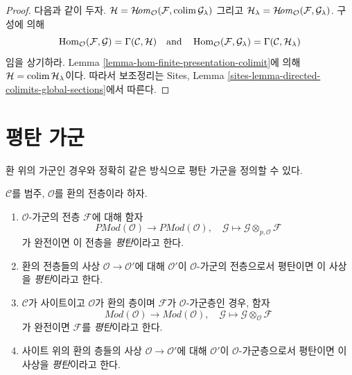 \begin{proof}
다음과 같이 두자.
$\mathcal{H} =
\mathop{\mathcal{H}\!\mathit{om}}\nolimits_\mathcal{O}(\mathcal{F}, \mathop{\mathrm{colim}}\nolimits \mathcal{G}_\lambda)$
그리고 $\mathcal{H}_\lambda =
\mathop{\mathcal{H}\!\mathit{om}}\nolimits_\mathcal{O}(\mathcal{F}, \mathcal{G}_\lambda)$.
구성에 의해
$$
\mathop{\mathrm{Hom}}\nolimits_\mathcal{O}(\mathcal{F}, \mathcal{G}) = \Gamma(\mathcal{C}, \mathcal{H})
\quad\text{and}\quad
\mathop{\mathrm{Hom}}\nolimits_\mathcal{O}(\mathcal{F}, \mathcal{G}_\lambda) =
\Gamma(\mathcal{C}, \mathcal{H}_\lambda)
$$
임을 상기하라. Lemma \ref{lemma-hom-finite-presentation-colimit}에 의해
$\mathcal{H} = \mathop{\mathrm{colim}}\nolimits \mathcal{H}_\lambda$이다. 따라서 보조정리는 Sites,
Lemma \ref{sites-lemma-directed-colimits-global-sections}에서 따른다.
\end{proof}









\section{평탄 가군}
\label{section-flat}

\noindent
환 위의 가군인 경우와 정확히 같은 방식으로 평탄 가군을 정의할 수 있다.

\begin{definition}
\label{definition-flat}
$\mathcal{C}$를 범주, $\mathcal{O}$를 환의 전층이라 하자.
\begin{enumerate}
\item $\mathcal{O}$-가군의 전층 $\mathcal{F}$에 대해 함자
$$
\textit{PMod}(\mathcal{O})
\longrightarrow
\textit{PMod}(\mathcal{O}), \quad
\mathcal{G} \mapsto \mathcal{G} \otimes_{p, \mathcal{O}} \mathcal{F}
$$
가 완전이면 이 전층을 {\it 평탄}이라고 한다.
\item 환의 전층들의 사상 $\mathcal{O} \to \mathcal{O}'$에 대해
$\mathcal{O}'$이 $\mathcal{O}$-가군의 전층으로서 평탄이면 이 사상을
{\it 평탄}이라고 한다.
\item $\mathcal{C}$가 사이트이고 $\mathcal{O}$가 환의 층이며
$\mathcal{F}$가 $\mathcal{O}$-가군층인 경우, 함자
$$
\textit{Mod}(\mathcal{O})
\longrightarrow
\textit{Mod}(\mathcal{O}), \quad
\mathcal{G} \mapsto \mathcal{G} \otimes_\mathcal{O} \mathcal{F}
$$
가 완전이면 $\mathcal{F}$를 {\it 평탄}이라고 한다.
\item 사이트 위의 환의 층들의 사상 $\mathcal{O} \to \mathcal{O}'$에 대해
$\mathcal{O}'$이 $\mathcal{O}$-가군층으로서 평탄이면 이 사상을
{\it 평탄}이라고 한다.
\end{enumerate}
\end{definition}

